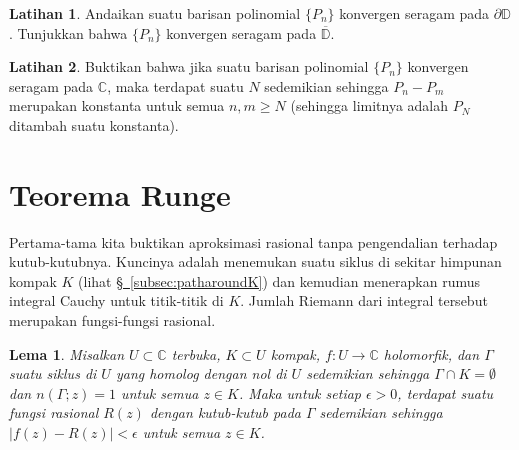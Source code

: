 \documentclass[12pt,openany]{book}
\newcommand{\sabs}[1]{\lvert {#1} \rvert}
\newcommand{\C}{{\mathbb{C}}}
\newcommand{\D}{{\mathbb{D}}}
\theoremstyle{plain}
\newtheorem{lemma}[thm]{Lema}
\theoremstyle{remark}
\theoremstyle{definition}
\newenvironment{exbox}{%
    \def\FrameCommand{\vrule width 1pt \relax\hspace{10pt}}%
    \MakeFramed{\advance\hsize-\width\FrameRestore}%
}{%
    \endMakeFramed
}
\theoremstyle{exercise}
\newtheorem{exercise}{Latihan}[section]
\theoremstyle{example}
\newcommand{\subsectionref}[1]{\hyperref[#1]{\S~\ref*{#1}}}
\begin{document}
\begin{exbox}
\begin{exercise}
Andaikan suatu barisan polinomial $\{ P_n \}$ konvergen seragam pada
$\partial \D$.  Tunjukkan bahwa $\{ P_n \}$ konvergen seragam pada
$\overline{\D}$.
\end{exercise}

\begin{exercise}
Buktikan bahwa jika suatu barisan polinomial $\{ P_n \}$ konvergen seragam pada
$\C$,
maka terdapat suatu $N$ sedemikian sehingga $P_n - P_m$ merupakan konstanta untuk semua $n,m \geq N$
(sehingga limitnya adalah $P_N$ ditambah suatu konstanta).
\end{exercise}
\end{exbox}



\section{Teorema Runge}
\label{sec:runge}

Pertama-tama kita buktikan aproksimasi rasional tanpa pengendalian terhadap kutub-kutubnya.
Kuncinya adalah menemukan suatu siklus di sekitar himpunan kompak $K$
(lihat \subsectionref{subsec:patharoundK})
dan kemudian menerapkan rumus integral Cauchy untuk titik-titik di $K$.
Jumlah Riemann dari
integral tersebut merupakan fungsi-fungsi rasional.

\begin{lemma} \label{lemma:ratapproxriemann}
Misalkan $U \subset \C$ terbuka, $K \subset U$ kompak, $f \colon U \to \C$
holomorfik, dan $\Gamma$ suatu siklus di $U$ yang homolog dengan nol di $U$
sedemikian sehingga $\Gamma \cap K = \emptyset$ dan $n(\Gamma;z) = 1$ untuk semua $z \in
K$.  Maka untuk setiap $\epsilon > 0$, terdapat suatu fungsi rasional $R(z)$ dengan
kutub-kutub pada $\Gamma$ sedemikian sehingga $\sabs{f(z)-R(z)} < \epsilon$ untuk semua $z \in K$.
\end{lemma}
\end{document}
